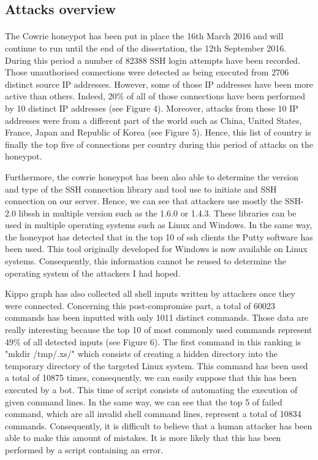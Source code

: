 \subsection{Attacks overview}

\paragraph{} %

The Cowrie honeypot has been put in place the 16th March 2016 and will continue to run
until the end of the dissertation, the 12th September 2016. During this period a number
of 82388 SSH login attempts have been recorded. Those unauthorised connections were detected
as being executed from 2706 distinct source IP addresses. However, some of those IP addresses
have been more active than others. Indeed, 20\% of all of those connections have been performed
by 10 distinct IP addresses (see Figure 4). Moreover, attacks from these 10 IP addresses were from a different
part of the world such as China, United States, France, Japan and Republic of Korea (see Figure 5).
Hence, this list of country is finally the top five of connections per country during this
period of attacks on the honeypot.


Furthermore, the cowrie honeypot has been also able to determine the version and type of the
SSH connection library and tool use to initiate and SSH connection on our server.
Hence, we can see that attackers use mostly the SSH-2.0 libssh in multiple version such as
the 1.6.0 or 1.4.3. These libraries can be used in multiple operating systems such as
Linux and Windows. In the same way, the honeypot has detected that in the top 10 of ssh clients
the Putty software has been used. This tool originally developed for Windows is now available
on Linux systems. Consequently, this information cannot be reused to determine the operating
system of the attackers I had hoped.

Kippo graph has also collected all shell inputs written by attackers once they were connected.
Concerning this post-compromise part, a total of 60023 commands has been inputted with
only 1011 distinct commands. Those data are really interesting because the top 10 of most
commonly used commands represent 49\% of all detected inputs (see Figure 6). The first command in this
ranking is "mkdir /tmp/.xs/" which consists of creating a hidden directory into the temporary directory of the targeted Linux system. This command has been used a total of 10875 times,
consequently, we can easily suppose that this has been executed by a bot. This time of script
consists of automating the execution of given command lines. In the same way, we can see that
the top 5 of failed command, which are all invalid shell command lines, represent a total
of 10834 commands. Consequently, it is difficult to believe that a human attacker has been
able to make this amount of mistakes. It is more likely that this has been performed by a
script containing an error.

